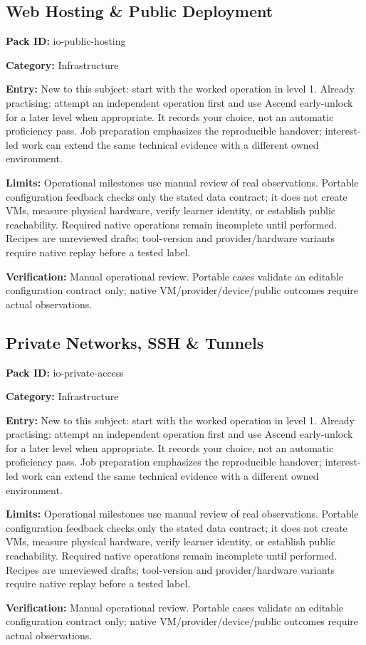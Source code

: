 \subsection{Web Hosting \& Public Deployment}
\noindent\textbf{Pack ID:} io-public-hosting\par
\noindent\textbf{Category:} Infrastructure\par
\noindent\textbf{Entry:} New to this subject: start with the worked operation in level 1. Already practising: attempt an independent operation first and use Ascend early-unlock for a later level when appropriate. It records your choice, not an automatic proficiency pass. Job preparation emphasizes the reproducible handover; interest-led work can extend the same technical evidence with a different owned environment.\par
\noindent\textbf{Limits:} Operational milestones use manual review of real observations. Portable configuration feedback checks only the stated data contract; it does not create VMs, measure physical hardware, verify learner identity, or establish public reachability. Required native operations remain incomplete until performed. Recipes are unreviewed drafts; tool-version and provider/hardware variants require native replay before a tested label.\par
\noindent\textbf{Verification:} Manual operational review. Portable cases validate an editable configuration contract only; native VM/provider/device/public outcomes require actual observations.\par
\subsection{Private Networks, SSH \& Tunnels}
\noindent\textbf{Pack ID:} io-private-access\par
\noindent\textbf{Category:} Infrastructure\par
\noindent\textbf{Entry:} New to this subject: start with the worked operation in level 1. Already practising: attempt an independent operation first and use Ascend early-unlock for a later level when appropriate. It records your choice, not an automatic proficiency pass. Job preparation emphasizes the reproducible handover; interest-led work can extend the same technical evidence with a different owned environment.\par
\noindent\textbf{Limits:} Operational milestones use manual review of real observations. Portable configuration feedback checks only the stated data contract; it does not create VMs, measure physical hardware, verify learner identity, or establish public reachability. Required native operations remain incomplete until performed. Recipes are unreviewed drafts; tool-version and provider/hardware variants require native replay before a tested label.\par
\noindent\textbf{Verification:} Manual operational review. Portable cases validate an editable configuration contract only; native VM/provider/device/public outcomes require actual observations.\par
